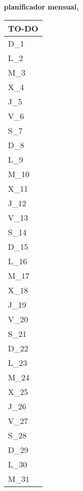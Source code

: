 \clearpage
{\raggedright
	\fontsize{25}{50}\selectfont
	\textbf{\NextYear}
}\scriptsize{\textbf{planificador mensual$_1$}}\\[11.3pt]



	\noindent\dotfill
	\renewcommand{\arraystretch}{1.5}\scriptsize
		\begin{longtabu} to \textwidth { X[l]}
		\centering \small{\textbf{TO-DO}} \\
		\toprule
		D_{1} \dotfill\\
		\hline
		L_{2} \dotfill\\
		M_{3} \dotfill\\
		X_{4} \dotfill\\
		J_{5} \dotfill\\
		V_{6} \dotfill\\
		S_{7} \dotfill\\
		D_{8} \dotfill\\
		\hline
		L_{9} \dotfill\\
		M_{10} \dotfill\\
		X_{11} \dotfill\\
		J_{12} \dotfill\\
		V_{13} \dotfill\\
		S_{14} \dotfill\\
		D_{15} \dotfill\\
		\hline
		L_{16} \dotfill\\
		M_{17} \dotfill\\
		X_{18} \dotfill\\
		J_{19} \dotfill\\
		V_{20} \dotfill\\
		S_{21} \dotfill\\
		D_{22} \dotfill\\
		\hline
		L_{23} \dotfill\\
		M_{24} \dotfill\\
		X_{25} \dotfill\\
		J_{26} \dotfill\\
		V_{27} \dotfill\\
		S_{28} \dotfill\\
		D_{29} \dotfill\\
		\hline
		L_{30} \dotfill\\
		M_{31} \dotfill\\

		\bottomrule

	\end{longtabu}


\clearpage
